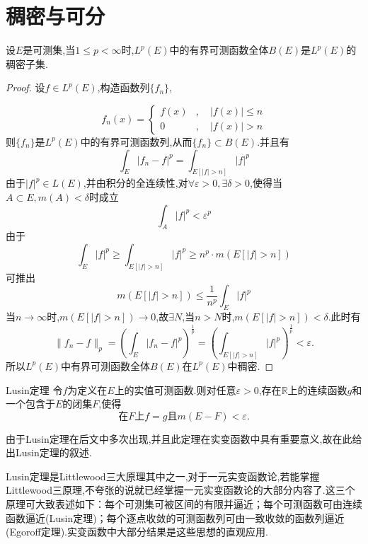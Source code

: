 \documentclass[lang=cn,18pt]{elegantbook}
\begin{document}
\section{稠密与可分}
\begin{theorem}
    设$E$是可测集,当$1 \leqslant p < \infty$时,$L^p(E)$中的有界可测函数全体$B(E)$是$L^p(E)$的稠密子集.
\end{theorem}
\begin{proof}
    设$f\in L^p(E)$,构造函数列$\{f_n\}$,

    \[
	f_n(x) = 
\begin{cases}
    f(x) &,\quad |f(x)| \leqslant n \\
    0 &,\quad |f(x)|>n
\end{cases}
\]
则$\{f_n\}$是$L^p(E)$中的有界可测函数列,从而$\{f_n\}\subset B(E)$.并且有
$$\int_{E}|f_n -f|^p=\int_{E[|f|>n]}|f|^p$$
由于$|f|^p\in L(E)$,并由积分的全连续性,对$\forall \varepsilon > 0,\exists \delta>0$,使得当$A\subset E,m(A)<\delta$时成立
$$\int_{A}|f|^p<\varepsilon^p$$
由于
$$\int_{E}|f|^p \geqslant\int_{E[|f|>n]}|f|^p \geqslant n^p\cdot m(E[|f|>n])$$
可推出
$$m(E[|f|>n])\leqslant \frac{1}{n^p}\int_{E}|f|^p$$
当$n \to \infty$时,$m(E[|f|>n])\to 0$,故$\exists N$,当$n >N$时,$m(E[|f|>n]) < \delta$.此时有
$$\|f_n-f\|_p=\left(\int_{E}|f_n -f|^p \right)^{\frac{1}{p}}=\left(\int_{E[|f|>n]}|f|^p \right)^{\frac{1}{p}} < \varepsilon. $$
所以$L^{p}(E)$中有界可测函数全体$B(E)$在$L^p(E)$中稠密.
\end{proof}

\begin{theorem}{\textreferencemark Lusin定理}
    令$f$为定义在$E$上的实值可测函数.则对任意$\varepsilon > 0$,存在$\mathbb{R}$上的连续函数$g$和一个包含于$E$的闭集$F$,使得
    $$\text{在}F\text{上}f=g\text{且}m(E-F)< \varepsilon.$$
    
\end{theorem}
\begin{note}
    由于Lusin定理在后文中多次出现,并且此定理在实变函数中具有重要意义,故在此给出Lusin定理的叙述.

    Lusin定理是Littlewood三大原理其中之一,对于一元实变函数论,若能掌握Littlewood三原理,不夸张的说就已经掌握一元实变函数论的大部分内容了.这三个原理可大致表述如下：每个可测集可被区间的有限并逼近；每个可测函数可由连续函数逼近(Lusin定理)；每个逐点收敛的可测函数列可由一致收敛的函数列逼近(Egoroff定理).实变函数中大部分结果是这些思想的直观应用.
\end{note}
\end{document}
